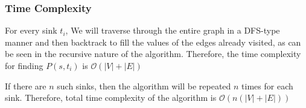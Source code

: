 \documentclass[12pt]{article}
\begin{document}
\pagebreak

\subsubsection{Time Complexity}

For every sink $t_i$, We will traverse through the entire graph in a DFS-type manner and then backtrack to fill the values of the edges already visited, as can be seen in the recursive nature of the algorithm. Therefore, the time complexity for finding $P(s, t_i)$ is $\mathcal{O}(|V| + |E|)$

If there are $n$ such sinks, then the algorithm will be repeated $n$ times for each sink. Therefore, total time complexity of the algorithm is $\mathcal{O}(n(|V| + |E|))$
\end{document}

